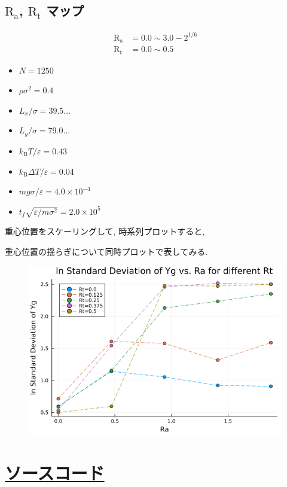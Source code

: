 \documentclass[dvipdfmx]{jsarticle}
\numberwithin{equation}{subsection}
\begin{document}
\subsection{$\text{R}_\text{a}$, $\text{R}_\text{t}$ マップ}


\begin{align}
  \text{R}_\text{a} &= 0.0 \sim 3.0 - 2^{1/6} \\
  \text{R}_\text{t} &= 0.0 \sim 0.5
\end{align}



\begin{itemize}
  \item $N = 1250$
  \item $\rho {\sigma}^2 = 0.4$
  \item $L_x / \sigma = 39.5\dots$
  \item $L_y / \sigma = 79.0\dots$
  \item $k_{\text{B}} T / \varepsilon = 0.43$
  \item $k_{\text{B}} \Delta T / \varepsilon = 0.04$
  \item $mg\sigma/\varepsilon = 4.0 \times 10^{-4}$
  \item $t_f \sqrt{\varepsilon / m \sigma^2} = 2.0 \times 10^{5}$
\end{itemize}



重心位置をスケーリングして, 時系列プロットすると,



重心位置の揺らぎについて同時プロットで表してみる.

\begin{figure}[H]
  \centering
  \includegraphics[scale=0.75]{image/lnStdYg_Ra_ti10000.png}
  \caption{}
  \label{}
\end{figure}

\appendix
\section{\href{https://github.com/m-agnet/Report.git}{ソースコード}}







\end{document}
